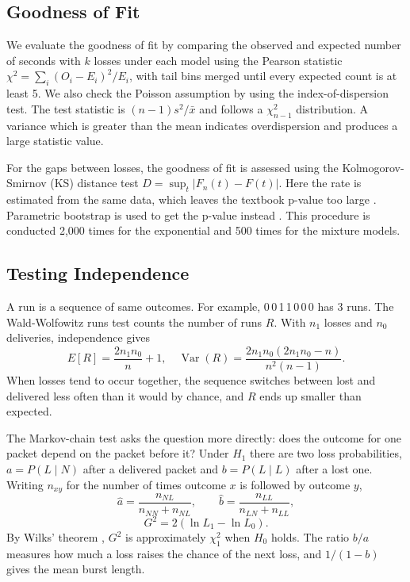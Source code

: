 \documentclass[conference]{IEEEtran}
\begin{document}
\subsection{Goodness of Fit}
We evaluate the goodness of fit by comparing the observed and expected number of seconds with $k$ losses under each model using the Pearson statistic $\chi^2=\sum_i (O_i-E_i)^2/E_i$, with tail bins merged until every expected count is at least 5. We also check the Poisson assumption by using the index-of-dispersion test. The test statistic is $(n-1)s^2/\bar x$ and follows a $\chi^2_{n-1}$ distribution. A variance which is greater than the mean indicates overdispersion and produces a large statistic value.

For the gaps between losses, the goodness of fit is assessed using the Kolmogorov-Smirnov (KS) distance test $D=\sup_t|F_n(t)-F(t)|$. Here the rate is estimated from the same data, which leaves the textbook p-value too large \cite{lilliefors1969}. Parametric bootstrap is used to get the p-value instead \cite{efron1993}. This procedure is conducted 2,000 times for the exponential and 500 times for the mixture models.

\subsection{Testing Independence}
A run is a sequence of same outcomes. For example, 0\,0\,1\,1\,0\,0\,0 has 3 runs. The Wald-Wolfowitz runs test \cite{wald1940} counts the number of runs $R$. With $n_1$ losses and $n_0$ deliveries, independence gives
\begin{equation}
E[R]=\frac{2n_1n_0}{n}+1,\quad \operatorname{Var}(R)=\frac{2n_1n_0(2n_1n_0-n)}{n^2(n-1)} .
\end{equation}
When losses tend to occur together, the sequence switches between lost and delivered less often than it would by chance, and $R$ ends up smaller than expected.

The Markov-chain test asks the question more directly: does the outcome for one packet depend on the packet before it? Under $H_1$ there are two loss probabilities, $a=P(L\mid N)$ after a delivered packet and $b=P(L\mid L)$ after a lost one. Writing $n_{xy}$ for the number of times outcome $x$ is followed by outcome $y$,
\begin{equation}
\hat a=\frac{n_{NL}}{n_{NN}+n_{NL}},\qquad \hat b=\frac{n_{LL}}{n_{LN}+n_{LL}},
\end{equation}
\begin{equation}
G^2=2(\ln L_1-\ln L_0).
\end{equation}
By Wilks' theorem \cite{wilks1938}, $G^2$ is approximately $\chi^2_1$ when $H_0$ holds. The ratio $b/a$ measures how much a loss raises the chance of the next loss, and $1/(1-b)$ gives the mean burst length.
\end{document}
